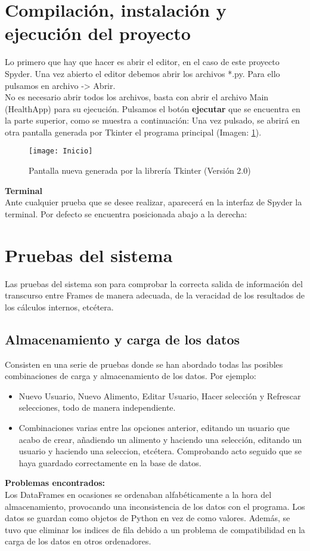 \section{Compilación, instalación y ejecución del proyecto}
Lo primero que hay que hacer es abrir el editor, en el caso de este proyecto Spyder. Una vez abierto el editor debemos abrir los archivos *.py. Para ello pulsamos en archivo -> Abrir.\\
No es necesario abrir todos los archivos, basta con abrir el archivo Main (HealthApp) para su ejecución. Pulsamos el botón \textbf{ejecutar} que se encuentra en la parte superior, como se muestra a continuación:
Una vez pulsado, se abrirá en otra pantalla generada por Tkinter el programa principal (Imagen: \ref{fig:Inicio}).\\
\begin{figure}[htb]
\centering
\texttt{[image: Inicio]} 
\caption{Pantalla nueva generada por la librería Tkinter (Versión 2.0)}
\label{fig:Inicio}
\end{figure}
\pagebreak

\textbf{Terminal}\\
Ante cualquier prueba que se desee realizar, aparecerá en la interfaz de Spyder la terminal. Por defecto se encuentra posicionada abajo a la derecha:
\section{Pruebas del sistema}
Las pruebas del sistema son para comprobar la correcta salida de información del transcurso entre Frames de manera adecuada, de la veracidad de los resultados de los cálculos internos, etcétera.
\subsection{Almacenamiento y carga de los datos}
Consisten en una serie de pruebas donde se han abordado todas las posibles combinaciones de carga y almacenamiento de los datos. Por ejemplo:
\begin{itemize}
\item Nuevo Usuario, Nuevo Alimento, Editar Usuario, Hacer selección y Refrescar selecciones, todo de manera independiente.
\item Combinaciones varias entre las opciones anterior, editando un usuario que acabo de crear, añadiendo un alimento y haciendo una selección, editando un usuario y haciendo una seleccion, etcétera. Comprobando acto seguido que se haya guardado correctamente en la base de datos.
\end{itemize}
\textbf{Problemas encontrados:}\\
Los DataFrames en ocasiones se ordenaban alfabéticamente a la hora del almacenamiento, provocando una inconsistencia de los datos con el programa. Los datos se guardan como objetos de Python en vez de como valores. Además, se tuvo que eliminar los indices de fila debido a un problema de compatibilidad en la carga de los datos en otros ordenadores.
